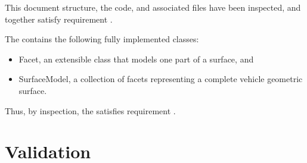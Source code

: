 \label{inspect:TLI}
 This document structure, the code, and associated files have been inspected, and together satisfy requirement .

\label{inspect:geo_modeling}

The \ModelDesc contains the following fully implemented classes:

\begin{itemize}
\item{Facet}, an extensible class that models one part of a surface,
and
\item{SurfaceModel}, a collection of facets representing a complete
vehicle geometric surface.
\end{itemize}

Thus, by inspection, the \ModelDesc satisfies
requirement .


\section{Validation}

